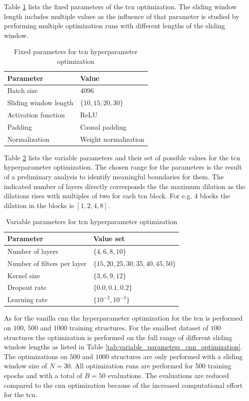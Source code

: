 \documentclass[conference]{IEEEtran}
\begin{document}
Table \ref{tab:fixed_parameters_tcn_optimization} lists the fixed parameters of the \gls{tcn} optimization. The sliding window length includes multiple values as the influence of that parameter is studied by performing multiple optimization runs with different lengths of the sliding window.

\begin{table}[htp]
	\centering
	\caption{Fixed parameters for \gls{tcn} hyperparameter optimization}
	\label{tab:fixed_parameters_tcn_optimization}
	\begin{tabular}{ll}
		\textbf{Parameter} & \textbf{Value} \\
		\hline
		Batch size & $ 4096 $ \\
		Sliding window length & $ \{10, 15, 20, 30\} $ \\
		Activation function & ReLU \\
		Padding & Causal padding \\
		Normalization & Weight normalization
	\end{tabular}
\end{table}

Table \ref{tab:variable_parameters_tcn_optimization} lists the variable parameters and their set of possible values for the \gls{tcn} hyperparameter optimization. The chosen range for the parameters is the result of a preliminary analysis to identify meaningful boundaries for them. The indicated number of layers directly corresponds the the maximum dilation as the dilations rises with multiples of two for each \gls{tcn} block. For e.g. 4 blocks the dilation in the blocks is $ [1, 2, 4, 8] $.

\begin{table}[htp]
	\centering
	\caption{Variable parameters for \gls{tcn} hyperparameter optimization}
	\label{tab:variable_parameters_tcn_optimization}
	\begin{tabular}{ll}
		\textbf{Parameter} & \textbf{Value set} \\
		\hline
		Number of layers & $ \{4, 6, 8, 10\} $ \\
		Number of filters per layer & $ \{15, 20, 25, 30, 35, 40, 45, 50\} $ \\
		Kernel size & $ \{3, 6, 9, 12\} $ \\
		Dropout rate & $ \{0.0, 0.1, 0.2\} $ \\
		Learning rate & $ \{10^{-2}, 10^{-3}\} $
	\end{tabular}
\end{table}

As for the vanilla \gls{cnn} the hyperparameter optimization for the \gls{tcn} is performed on $ 100 $, $ 500 $ and $ 1000 $  training structures. For the smallest dataset of $ 100 $ structures the optimization is performed on the full range of different sliding window lengths as listed in Table \ref{tab:variable_parameters_cnn_optimization}. The optimizations on $ 500 $ and $ 1000 $ structures are only performed with a sliding window size of $ N = 30 $. All optimization runs are performed for 500 training epochs and with a total of $ B = 50 $ evaluations. The evaluations are reduced compared to the \gls{cnn} optimization because of the increased computational effort for the \gls{tcn}.
\end{document}

